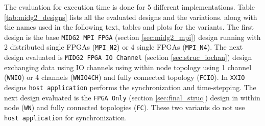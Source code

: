 The evaluation for execution time is done for 5 different implementations.
Table \ref{tab:midg2_designs} lists all the evaluated designs and the variations.
along with the names used in the following text, tables and plots for the variants.
The first design is the base \texttt{MIDG2 MPI FPGA} (section \ref{sec:midg2_mpi}) design running with
2 distributed single FPGAs (\texttt{MPI\_N2}) or 4 single FPGAs (\texttt{MPI\_N4}).
The next design evaluated is \texttt{MIDG2 FPGA IO Channel} (section \ref{sec:struc_iochan})
design exchanging data using IO channels using within node topology using 1 channel (\texttt{WNIO})
or 4 channels (\texttt{WNIO4CH}) and fully connected topology (\texttt{FCIO}). In \texttt{XXIO} designs
\texttt{host application} performs the synchronization and time-stepping.
The next design evaluated is the \texttt{FPGA Only} (section \ref{sec:final_struc}) design in
within node (\texttt{WN}) and fully connected topologies (\texttt{FC}). These two variants do not use
\texttt{host application} for synchronization.
